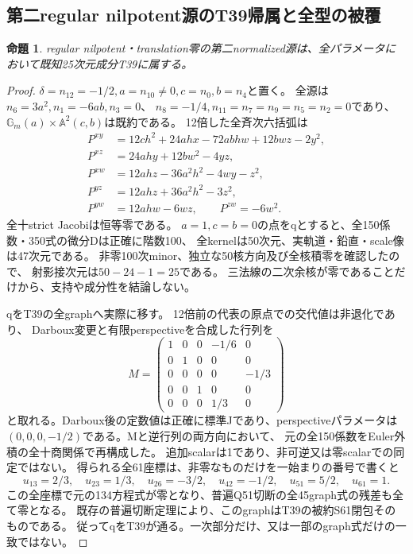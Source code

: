 \documentclass[a4paper,11pt]{ltjsarticle}
\newtheorem{proposition}{命題}[section]
\theoremstyle{definition}
\begin{document}
\subsection{第二regular nilpotent源のT39帰属と全型の被覆}
\begin{proposition}\label{prop:nil4-quartic-second-t39}
regular nilpotent・translation零の第二normalized源は、全パラメータにおいて既知25次元成分T39に属する。
\end{proposition}
\begin{proof}
$\delta=n_{12}=-1/2,a=n_{10}\ne0,c=n_0,b=n_4$と置く。
全源は$n_6=3a^2,n_1=-6ab,n_3=0$、
$n_8=-1/4,n_{11}=n_7=n_9=n_5=n_2=0$であり、$\mathbb G_m(a)\times\mathbb A^2(c,b)$は既約である。
12倍した全斉次六括弧は
\[
\begin{aligned}
 P^{xy}&=12ch^2+24ahx-72abhw+12bwz-2y^2,\\
 P^{xz}&=24ahy+12bw^2-4yz,\\
 P^{xw}&=12ahz-36a^2h^2-4wy-z^2,\\
 P^{yz}&=12ahz+36a^2h^2-3z^2,\\
 P^{yw}&=12ahw-6wz,\qquad P^{zw}=-6w^2.
\end{aligned}
\]
全十strict Jacobiは恒等零である。
$a=1,c=b=0$の点をqとすると、全150係数・350式の微分Dは正確に階数100、
全kernelは50次元、実軌道・鉛直・scale像は47次元である。
非零100次minor、独立な50核方向及び全核積零を確認したので、
射影接次元は$50-24-1=25$である。
三法線の二次余核が零であることだけから、支持や成分性を結論しない。

qをT39の全graphへ実際に移す。
12倍前の代表の原点での交代値は非退化であり、
Darboux変更と有限perspectiveを合成した行列を
\[
 M=\begin{pmatrix}
 1&0&0&-1/6&0\\
 0&1&0&0&0\\
 0&0&0&0&-1/3\\
 0&0&1&0&0\\
 0&0&0&1/3&0
 \end{pmatrix}
\]
と取れる。Darboux後の定数値は正確に標準Jであり、perspectiveパラメータは
$(0,0,0,-1/2)$である。Mと逆行列の両方向において、
元の全150係数をEuler外積の全十商関係で再構成した。
追加scalarは1であり、非可逆又は零scalarでの同定ではない。
得られる全61座標は、非零なものだけを一始まりの番号で書くと
\[
 u_{13}=2/3,\quad u_{23}=1/3,\quad u_{26}=-3/2,
 \quad u_{42}=-1/2,\quad u_{51}=5/2,\quad u_{61}=1.
\]
この全座標で元の134方程式が零となり、普遍Q51切断の全45graph式の残差も全て零となる。
既存の普遍切断定理により、このgraphはT39の被約S61閉包そのものである。
従ってqをT39が通る。一次部分だけ、又は一部のgraph式だけの一致ではない。


\end{proof}
\end{document}

